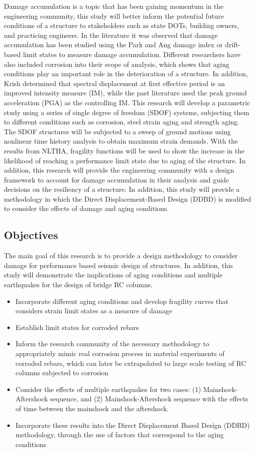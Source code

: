 Damage accumulation is a topic that has been gaining momentum in the engineering community, this study will better inform  the potential future conditions of a structure to stakeholders such as state DOTs, building owners, and practicing engineers. In the literature it was observed that damage accumulation has been studied using the Park and Ang damage index or drift-based limit states to measure damage accumulation. Different researchers have also included corrosion into their scope of analysis, which shows that aging conditions play an important role in the deterioration of a structure. In addition, Krish \cite{Krish2018} determined that spectral displacement at first effective period is an improved intensity measure (IM), while the past literature used the peak ground acceleration (PGA) as the controlling IM. This research will develop a parametric study using a series of single degree of freedom (SDOF) systems, subjecting them to different conditions such as corrosion, steel strain aging and strength aging. The SDOF structures will be subjected to a sweep of ground motions using nonlinear time history analysis to obtain maximum strain demands. With the results from NLTHA, fragility functions will be used to show the increase in the likelihood of reaching a performance limit state due to aging of the structure. In addition, this research will provide the engineering community with a design framework to account for damage accumulation in their analysis and guide decisions on the resiliency of a structure. In addition, this study will provide a methodology in which the Direct Displacement-Based Design (DDBD) is modified to consider the effects of damage and aging conditions.

\subsection{Objectives}
The main goal of this research is to provide a design methodology to consider damage for performance based seismic design of structures. In addition, this study will demonstrate the implications of aging conditions and multiple earthquakes for the design of bridge RC columns.


\begin{itemize}
	\item Incorporate different aging conditions and develop fragility curves that considers strain limit states as a measure of damage
	\item Establish limit states for corroded rebars
	\item Inform the research community of the necessary methodology to appropriately mimic real corrosion process in material experiments of corroded rebars, which can later be extrapolated to large scale testing of RC columns subjected to corrosion
	\item Consider the effects of multiple earthquakes for  two cases: (1) Mainshock-Aftershock sequence, and (2) Mainshock-Aftershock sequence with the effects of time between the mainshock and the aftershock.
	\item Incorporate these results into the Direct Displacement Based Design (DDBD) methodology, through the use of factors that correspond to the aging conditions
\end{itemize}